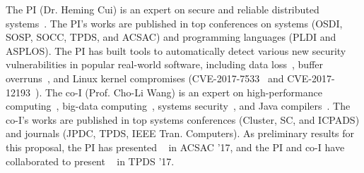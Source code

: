 The PI (Dr. Heming Cui) is an expert on secure and reliable distributed 
systems~\cite{smt:cacm, cui:tern:osdi10, peregrine:sosp11,
parrot:sosp13, crane:sosp15, tripod:apsys16, kakute:acsac17, apus:socc17,
confluence:tpds17}. The PI's works are published in top conferences on systems 
(OSDI, SOSP, SOCC, TPDS, and ACSAC) and programming languages (PLDI and ASPLOS). 
The PI has built tools to automatically detect various new security 
vulnerabilities in popular real-world software, including data 
loss~\cite{woodpecker:asplos13}, buffer overruns~\cite{wu:pldi12}, and Linux 
kernel compromises (CVE-2017-7533~\cite{cv3-2017-7533} and 
CVE-2017-12193~\cite{cve-2017-12193}). The co-I (Prof. Cho-Li Wang) is an 
expert on 
high-performance computing~\cite{powerrock,hwang,jessica,cheung,khokhar,sheng,
shengdi1}, big-data computing~\cite{tbd}, systems security~\cite{tbd}, and Java 
compilers~\cite{rhymes,shengdi,jessica2}. The co-I's works are published in top 
systems conferences (Cluster, SC, and ICPADS) and journals (JPDC, TPDS, IEEE 
Tran. Computers). As preliminary results for this proposal, the PI has 
presented \kakute~\cite{kakute:acsac17} in ACSAC '17, and the PI and co-I have 
collaborated to present \confluence~\cite{confluence:tpds17} in TPDS '17.


